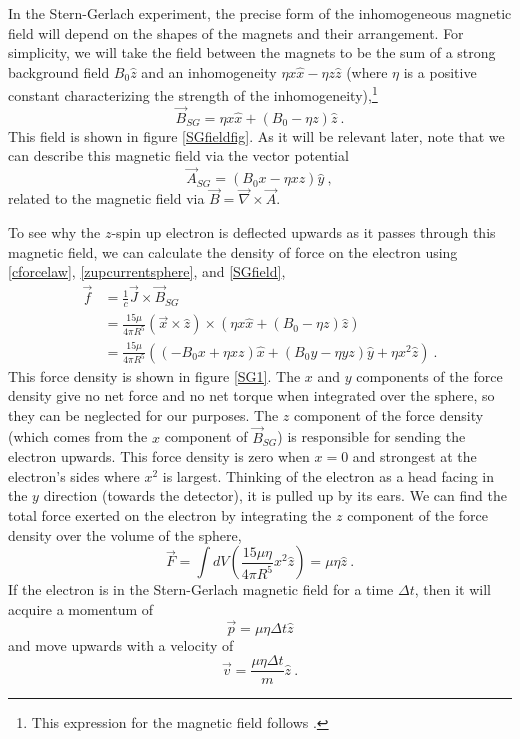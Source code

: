 \documentclass[12pt,secnumarabic,amsmath,amssymb,balancelastpage,nofootinbib]{article}
\begin{document}
In the Stern-Gerlach experiment, the precise form of the inhomogeneous magnetic field will depend on the shapes of the magnets and their arrangement.  For simplicity, we will take the field between the magnets to be the sum of a strong background field $B_0\hat{z}$ and an inhomogeneity $\eta x \hat{x}- \eta z\hat{z}$ (where $\eta$ is a positive constant characterizing the strength of the inhomogeneity),\footnote{This expression for the magnetic field follows \citet[pg.\ 181]{griffithsQM}.}
\begin{equation}
\vec{B}_{SG}=\eta x \hat{x}+(B_0 - \eta z)\hat{z}
\ .
\label{SGfield}
\end{equation}
This field is shown in figure \ref{SGfieldfig}.  As it will be relevant later, note that we can describe this magnetic field via the vector potential
\begin{equation}
\vec{A}_{SG}=(B_0 x - \eta x z)\hat{y}
\ ,
\label{SGvector}
\end{equation}
related to the magnetic field via $\vec{B}=\vec{\nabla}\times\vec{A}$.

To see why the $z$-spin up electron is deflected upwards as it passes through this magnetic field, we can calculate the density of force on the electron using \eqref{cforcelaw}, \eqref{zupcurrentsphere}, and \eqref{SGfield},
\begin{align}
\vec{f}&=\frac{1}{c}\vec{J}\times\vec{B}_{SG}
\nonumber
\\
&=\frac{15 \mu}{4 \pi R^5} (\vec{x}\times\hat{z})\times(\eta x \hat{x} +(B_0 - \eta z)\hat{z})
\nonumber
\\
&=\frac{15 \mu}{4 \pi R^5} \left( (-B_0 x + \eta x z) \hat{x} + (B_0 y - \eta y z)\hat{y} + \eta x^2 \hat{z} \right)
\ .
\label{zupsphereforcedensity}
\end{align}
This force density is shown in figure \ref{SG1}.  The $x$ and $y$ components of the force density give no net force and no net torque when integrated over the sphere, so they can be neglected for our purposes.  The  $z$ component of the force density (which comes from the $x$ component of $\vec{B}_{SG}$) is responsible for sending the electron upwards.  This force density is zero when $x=0$ and strongest at the electron's sides where $x^2$ is largest.  Thinking of the electron as a head facing in the $y$ direction (towards the detector), it is pulled up by its ears.  We can find the total force exerted on the electron by integrating the $z$ component of the force density over the volume of the sphere,
\begin{equation}
\vec{F}= \int dV \left( \frac{15 \mu \eta}{4 \pi R^5} x^2 \hat{z}\right)=\mu \eta \hat{z}
\ .
\label{zforcesphere}
\end{equation}
If the electron is in the Stern-Gerlach magnetic field for a time $\Delta t$, then it will acquire a momentum of
\begin{equation}
\vec{p}=\mu \eta \Delta t \hat{z}
\label{zmomentumsphere}
\end{equation}
and move upwards with a velocity of
\begin{equation}
\vec{v}=\frac{\mu \eta \Delta t}{m} \hat{z}
\ .
\label{zvelocitysphere}
\end{equation}
\end{document}
